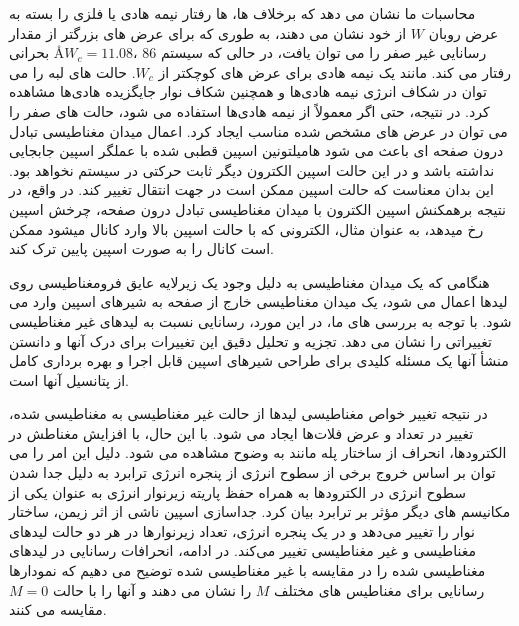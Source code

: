 محاسبات ما نشان می دهد که برخلاف  ها، ها رفتار نیمه هادی یا فلزی را بسته به عرض روبان $W$ از خود نشان می دهند، به طوری که برای عرض های بزرگتر از مقدار بحرانی \AA $W_c = 11.08$، 86 رسانایی غیر صفر را می توان یافت، در حالی که سیستم رفتار می کند. مانند یک نیمه هادی برای عرض های کوچکتر از $W_c$. حالت های لبه را می توان در شکاف انرژی نیمه هادی‌ها و همچنین شکاف نوار جایگزیده هادی‌ها مشاهده کرد. در نتیجه، حتی اگر معمولاً از نیمه هادی‌ها استفاده می شود، حالت های صفر را می توان در عرض های مشخص شده مناسب ایجاد کرد. اعمال میدان مغناطیسی تبادل درون صفحه ای باعث می شود هامیلتونین اسپین قطبی شده با عملگر اسپین  جابجایی نداشته باشد و در این حالت اسپین الکترون دیگر ثابت حرکتی در سیستم نخواهد بود. این بدان معناست که حالت اسپین ممکن است در جهت انتقال تغییر کند. در واقع، در نتیجه برهمکنش اسپین الکترون با میدان مغناطیسی تبادل درون صفحه، چرخش اسپین رخ میدهد، به عنوان مثال، الکترونی که با حالت اسپین بالا وارد کانال میشود ممکن است کانال را به صورت اسپین پایین ترک کند. 

هنگامی که یک میدان مغناطیسی به دلیل وجود یک زیرلایه عایق فرومغناطیسی روی لیدها اعمال می شود، یک میدان مغناطیسی خارج از صفحه به شیرهای اسپین وارد می شود. با توجه به بررسی های ما، در این مورد، رسانایی نسبت به لیدهای غیر مغناطیسی تغییراتی را نشان می دهد. تجزیه و تحلیل دقیق این تغییرات برای درک آنها و دانستن منشأ آنها یک مسئله کلیدی برای طراحی شیرهای اسپین قابل اجرا و بهره برداری کامل از پتانسیل آنها است. 


در نتیجه تغییر خواص مغناطیسی لیدها از حالت غیر مغناطیسی به مغناطیسی شده، تغییر در تعداد و عرض فلات‌ها ایجاد می شود. با این حال، با افزایش مغناطش در الکترودها، انحراف از ساختار پله مانند به وضوح مشاهده می شود. دلیل این امر را می توان بر اساس خروج برخی از سطوح انرژی از پنجره انرژی ترابرد به دلیل جدا شدن سطوح انرژی در الکترودها به همراه حفظ پاریته زیرنوار انرژی به عنوان یکی از مکانیسم های دیگر مؤثر بر ترابرد بیان کرد. جداسازی اسپین ناشی از \gls{اثر زیمن}، ساختار نوار را تغییر می‌دهد و در یک پنجره انرژی، تعداد زیر‌نوارها در هر دو حالت لیدهای مغناطیسی و غیر مغناطیسی تغییر می‌کند. در ادامه، انحرافات رسانایی در لیدهای مغناطیسی شده را در مقایسه با غیر مغناطیسی شده توضیح می دهیم که نمودارها رسانایی برای مغناطیس های مختلف $M$ را نشان می دهند و آنها را با حالت $M = 0$ مقایسه می کنند.

